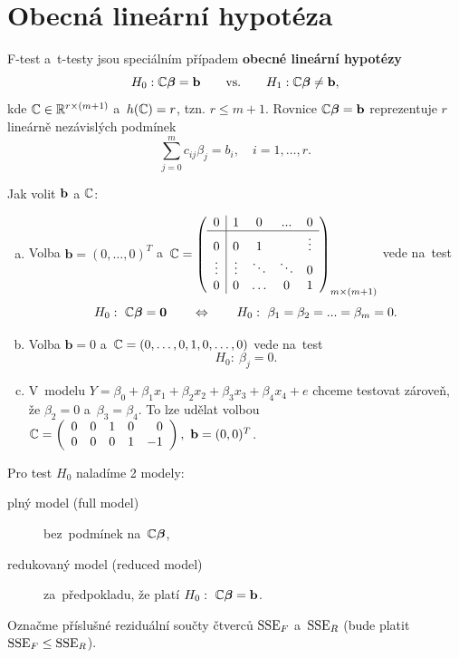 \section{Obecná lineární hypotéza}
F-test a~t-testy jsou speciálním případem \textbf{obecné lineární hypotézy}
 $$ H_0: \mathbb{C}\boldsymbol{\beta} = \textbf{b} \qquad\text{vs.}\qquad H_1: \mathbb{C}\boldsymbol{\beta}\neq\textbf{b}, $$
kde $\mathbb{C}\in\mathbb{R}^{r\times(m+1)}$ a~$h(\mathbb{C}) = r$, tzn. $r\leq m+1$. Rovnice $\mathbb{C}\boldsymbol{\beta} = \textbf{b}$ reprezentuje $r$ lineárně nezávislých podmínek
 $$ \sum_{j = 0}^m c_{ij}\beta_j = b_i,\quad i = 1,\dots,r. $$
\begin{remark}
	Jak volit $\mathbf{b}$ a $\mathbb{C}$:
	
	\begin{enumerate}[a)]
		\item Volba $\textbf{b} = (0,\dots,0)^T$ a~$ \mathbb{C} = \left(\begin{array}{c|cccc}
		0 & 1 & 0 &... & 0 \\\hline
		0 & 0 & 1 &  & \vdots \\
		\vdots& \vdots & \ddots & \ddots & 0 \\
		0 & 0 & \dots & 0 & 1
		\end{array}
		\right)_{m\times(m+1)} $ vede na~test
		 $$ H_0:~\mathbb{C}\boldsymbol{\beta} = \boldsymbol{0}\qquad\Leftrightarrow\qquad H_0:~\beta_1 = \beta_2 = ... = \beta_m = 0. $$
		\item Volba $\textbf{b} = 0$ a~$\mathbb{C} = (0,\dots,0,1,0,\dots,0)$ vede na~test
		 $$ H_0:~\beta_j = 0. $$
		\item V~modelu $Y = \beta_0+\beta_1x_1+\beta_2x_2+\beta_3x_3+\beta_4x_4+e$ chceme testovat zároveň, že $\beta_2 = 0$ a~$\beta_3 = \beta_4$. To lze udělat volbou $ \mathbb{C} = \left(\begin{array}{rrrrr}
		0 & 0 & 1 & 0 & 0 \\
		0 & 0 & 0 & 1 & -1
		\end{array}
		 \right),~\textbf{b} = (0,0)^T $.
	\end{enumerate}
\end{remark}

Pro test $H_0$ naladíme 2 modely:\begin{description}
\item[plný model (full model)] bez~podmínek na~$\mathbb{C}\boldsymbol{\beta}$,
\item[redukovaný model (reduced model)] za~předpokladu, že platí $H_0:~\mathbb{C}\boldsymbol{\beta} = \mathbf{b}$.
\end{description}

Označme příslušné reziduální součty čtverců $\mathrm{SSE}_F$ a~$\mathrm{SSE}_R$ (bude platit $\mathrm{SSE}_F\leq\mathrm{SSE}_R$).

